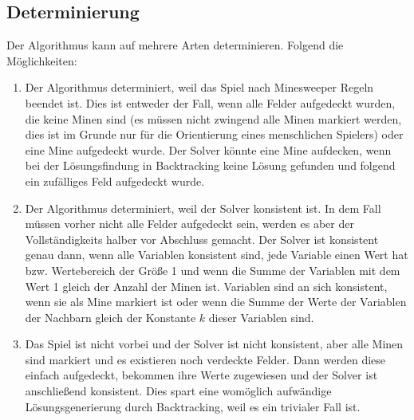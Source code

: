 \subsection{Determinierung}

Der Algorithmus kann auf mehrere Arten determinieren. Folgend die Möglichkeiten:
\begin{enumerate}
    \item Der Algorithmus determiniert, weil das Spiel nach Minesweeper Regeln beendet ist. Dies ist entweder der Fall, wenn alle Felder aufgedeckt
    wurden, die keine Minen sind (es müssen nicht zwingend alle Minen markiert werden, dies ist im Grunde nur für die Orientierung eines menschlichen
    Spielers) oder eine Mine aufgedeckt wurde. Der Solver könnte eine Mine aufdecken, wenn bei der Lösungsfindung in Backtracking keine Lösung
    gefunden und folgend ein zufälliges Feld aufgedeckt wurde.
    \item Der Algorithmus determiniert, weil der Solver konsistent ist. In dem Fall müssen vorher nicht alle Felder aufgedeckt sein, werden
    es aber der Vollständigkeits halber vor Abschluss gemacht. Der Solver ist konsistent genau dann, wenn alle Variablen konsistent sind, 
    jede Variable einen Wert hat bzw. Wertebereich der Größe 1 und wenn die Summe der Variablen mit dem Wert 1 gleich der Anzahl der Minen ist.
    Variablen sind an sich konsistent, wenn sie als Mine markiert ist oder wenn die Summe der Werte der Variablen der Nachbarn gleich der
    Konstante $k$ dieser Variablen sind.
    \item Das Spiel ist nicht vorbei und der Solver ist nicht konsistent, aber alle Minen sind markiert und es existieren noch verdeckte Felder.
    Dann werden diese einfach aufgedeckt, bekommen ihre Werte zugewiesen und der Solver ist anschließend konsistent. Dies spart eine womöglich
    aufwändige Lösungsgenerierung durch Backtracking, weil es ein trivialer Fall ist.
\end{enumerate}
